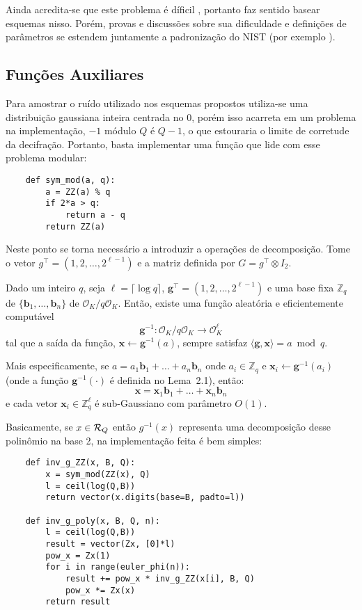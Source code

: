 Ainda acredita-se que este problema é díficil \cite{BrakerskiEtAl2013}, portanto faz sentido basear esquemas nisso. Porém, provas
e discussões sobre sua dificuldade e definições de parâmetros se estendem juntamente a padronização do NIST (por exemplo \cite{Balbas2021}). 

\subsection{Funções Auxiliares}

Para amostrar o ruído utilizado nos esquemas propostos utiliza-se uma distribuição gaussiana inteira centrada no $0$, porém isso 
acarreta em um problema na implementação, $-1$ módulo $Q$ é $Q-1$, o que estouraria o limite de corretude da decifração. Portanto,
basta implementar uma função que lide com esse problema modular:

\begin{verbatim}
    def sym_mod(a, q):
        a = ZZ(a) % q
        if 2*a > q:
            return a - q
        return ZZ(a)
\end{verbatim}

Neste ponto se torna necessário a introduzir a operações de decomposição. Tome o vetor $g^\top = (1, 2, \dots, 2^{\ell-1})$ e a matriz definida por 
$G = g^\top \otimes I_2$.  

\begin{lemma}
Dado um inteiro $q$, seja $\ell = \lceil \log q \rceil$, $\mathbf{g}^\top = (1, 2, \dots, 2^{\ell - 1})$ e uma base fixa $\mathbb{Z}_q$ de $\{ \mathbf{b}_1, \dots, \mathbf{b}_n \}$ de $\mathcal{O}_K / q \mathcal{O}_K$. Então, existe uma função aleatória e eficientemente computável
\[
\mathbf{g}^{-1} : \mathcal{O}_K / q \mathcal{O}_K \rightarrow \mathcal{O}_K^\ell
\]
tal que a saída da função, $\mathbf{x} \leftarrow \mathbf{g}^{-1}(a)$, sempre satisfaz $\langle \mathbf{g}, \mathbf{x} \rangle = a \bmod q$.

Mais especificamente, se $a = a_1 \mathbf{b}_1 + \dots + a_n \mathbf{b}_n$ onde $a_i \in \mathbb{Z}_q$ e $\mathbf{x}_i \leftarrow \mathbf{g}^{-1}(a_i)$ (onde a função $\mathbf{g}^{-1}(\cdot)$ é definida no Lema~2.1), então:
\[
\mathbf{x} = \mathbf{x}_1 \mathbf{b}_1 + \dots + \mathbf{x}_n \mathbf{b}_n
\]
e cada vetor $\mathbf{x}_i \in \mathbb{Z}_q^\ell$ é sub-Gaussiano com parâmetro $O(1)$.
\end{lemma}

Basicamente, se $x \in \mathcal{R}_Q$ então $g^{-1}(x)$ representa uma decomposição desse polinômio na base 2, na implementação feita
é bem simples:
\begin{verbatim}
    def inv_g_ZZ(x, B, Q):
        x = sym_mod(ZZ(x), Q)
        l = ceil(log(Q,B))
        return vector(x.digits(base=B, padto=l))

    def inv_g_poly(x, B, Q, n):
        l = ceil(log(Q,B))
        result = vector(Zx, [0]*l)
        pow_x = Zx(1)
        for i in range(euler_phi(n)):
            result += pow_x * inv_g_ZZ(x[i], B, Q)
            pow_x *= Zx(x)
        return result
\end{verbatim} 

